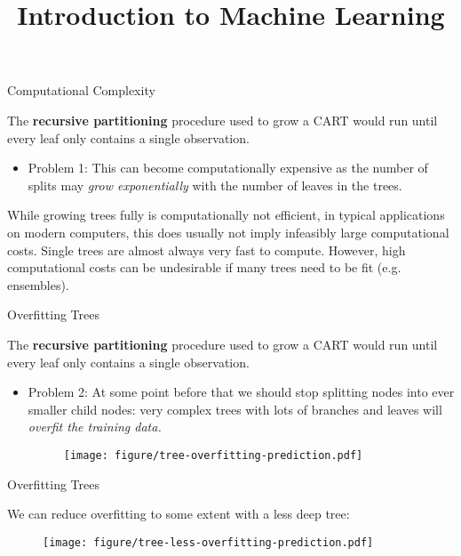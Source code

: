 \documentclass[11pt,compress,t,notes=noshow, xcolor=table]{beamer}
\title{Introduction to Machine Learning}
\institute{\href{https://compstat-lmu.github.io/lecture_i2ml/}{compstat-lmu.github.io/lecture\_i2ml}}
\date{}
\begin{document}
\sloppy

\begin{vbframe}{Computational Complexity}

The \textbf{recursive partitioning} procedure used to grow a CART would run until every leaf only contains a single observation. 
\begin{itemize}
\item Problem 1: This can become computationally expensive as the number of splits may \emph{grow exponentially} with the number of leaves in the trees.
\end{itemize}

While growing trees fully is computationally not efficient, in typical applications on modern computers, this does usually not imply infeasibly large computational costs.
Single trees are almost always very fast to compute.
However, high computational costs can be undesirable if many trees need to be fit (e.g. ensembles).

\end{vbframe}

\begin{vbframe}{Overfitting Trees}

The \textbf{recursive partitioning} procedure used to grow a CART would run until every leaf only contains a single observation. 
\begin{itemize}
\item Problem 2: At some point before that we should stop splitting nodes into ever smaller child nodes: very complex trees with lots of branches and leaves will \emph{overfit the training data.}

\begin{figure}
\centering
\texttt{[image: figure/tree-overfitting-prediction.pdf]}
\end{figure}

\end{itemize}

\end{vbframe}

\begin{vbframe}{Overfitting Trees}

We can reduce overfitting to some extent with a less deep tree:
\vspace{0.25cm}

\begin{figure}
\centering
\texttt{[image: figure/tree-less-overfitting-prediction.pdf]}
\end{figure}

\end{vbframe}
\end{document}
